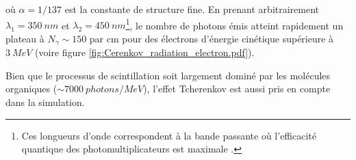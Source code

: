 \bigbreak 

où $\alpha = 1/137$ est la constante de structure fine. En prenant arbitrairement $\lambda_1 = \SI{350}{nm}$ et $\lambda_2 = \SI{450}{nm}$\footnote{Ces longueurs d'onde correspondent à la bande passante où l'efficacité quantique des photomultiplicateurs est maximale \cite{Wang:2015vla}.}, le nombre de photons émis atteint rapidement un plateau à $N_\gamma \sim 150$ par cm pour des électrons d'énergie cinétique supérieure à $3 \SI{}{MeV}$ (voire figure \ref{fig:Cerenkov_radiation_electron.pdf}).\\ 



Bien que le processus de scintillation soit largement dominé par les molécules organiques ($\sim \SI{7000}{photons/MeV}$), l'effet Tcherenkov est aussi pris en compte dans la simulation. 

\bigbreak 


